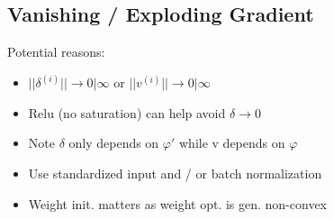 \subsection{Vanishing / Exploding Gradient}

Potential reasons:
\begin{itemize}
    \item $||\delta^{(i)}|| \rightarrow 0 | \infty$ or $||v^{(i)}|| \rightarrow 0 | \infty$
    \item Relu (no saturation) can help avoid $\delta \rightarrow 0$
    \item Note $\delta$ only depends on $\varphi'$ while v depends on $\varphi$
    \item Use standardized input and / or batch normalization
    \item Weight init. matters as weight opt. is gen. non-convex
\end{itemize}


